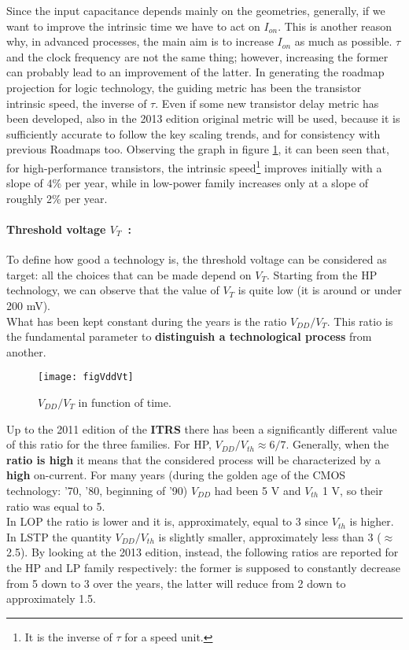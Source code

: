 \documentclass[a4paper, 12pt, twoside, openright]{report}
\begin{document}
Since the input capacitance depends mainly on the geometries, generally, if we want to improve the intrinsic time we have to act on $I_{on}$. This is another reason why, in advanced processes, the main aim is to increase $I_{on}$ as much as possible. $\tau$ and the clock frequency are not the same thing; however, increasing the former can probably lead to an improvement of the latter.
In generating the roadmap projection for logic technology, the guiding metric has been the transistor intrinsic speed, the inverse of $\tau$. Even if some new transistor delay metric has been developed, also in the 2013 edition original metric will be used, because it is sufficiently accurate to follow the key scaling trends, and for consistency with previous Roadmaps too.
Observing the graph in figure \ref{tau}, it can been seen that, for high-performance transistors, the intrinsic speed\footnote{It is the inverse of $\tau$ for a speed unit.} improves initially with a slope of 4\% per year, while in low-power family increases only at a slope of roughly 2\% per year. 


\paragraph{Threshold voltage $V_{T}$~:} To define how good a technology is, the threshold voltage can be considered as target: all the choices that can be made depend on $V_{T}$. Starting from the HP technology, we can observe that the value of $V_{T}$ is quite low (it is around or under 200 mV).\\
What has been kept constant during the years is the ratio $V_{DD}/V_{T}$. This ratio is the fundamental parameter to \textbf{distinguish a technological process} from another.

	\begin{figure}[H]
	\centering
	\texttt{[image: figVddVt]}
	\caption{$V_{DD}/V_{T}$ in function of time.}
	\label{tau}
	\end{figure}

Up to the 2011 edition of the \textbf{ITRS} there has been a significantly different value of this ratio for the three families. For HP, $V_{DD}/V_{th} \approx 6/7$. Generally, when the \textbf{ratio is high} it means that the considered process will be characterized by a \textbf{high} on-current. For many years (during the golden age of the CMOS technology: '70, '80, beginning of '90) $V_{DD}$ had been 5 V and $V_{th}$ 1 V, so their ratio was equal to 5.\\
In LOP the ratio is lower and it is, approximately, equal to 3 since $V_{th}$ is higher.\\
In LSTP the quantity $V_{DD}/V_{th}$ is slightly smaller, approximately less than 3 ($\approx$ 2.5).
By looking at the 2013 edition, instead, the following ratios are reported for the HP and LP family respectively: the former is supposed to constantly decrease from 5 down to 3 over the years, the latter will reduce from 2 down to approximately 1.5. 
\end{document}
